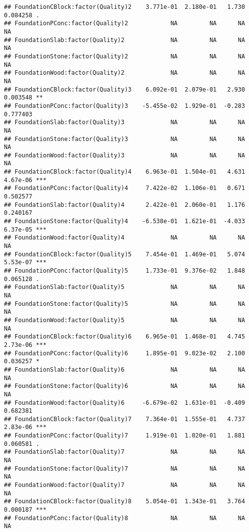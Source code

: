 \documentclass[
]{article}
\begin{document}
\begin{verbatim}
## FoundationCBlock:factor(Quality)2    3.771e-01  2.180e-01   1.730 0.084258 .  
## FoundationPConc:factor(Quality)2            NA         NA      NA       NA    
## FoundationSlab:factor(Quality)2             NA         NA      NA       NA    
## FoundationStone:factor(Quality)2            NA         NA      NA       NA    
## FoundationWood:factor(Quality)2             NA         NA      NA       NA    
## FoundationCBlock:factor(Quality)3    6.092e-01  2.079e-01   2.930 0.003548 ** 
## FoundationPConc:factor(Quality)3    -5.455e-02  1.929e-01  -0.283 0.777403    
## FoundationSlab:factor(Quality)3             NA         NA      NA       NA    
## FoundationStone:factor(Quality)3            NA         NA      NA       NA    
## FoundationWood:factor(Quality)3             NA         NA      NA       NA    
## FoundationCBlock:factor(Quality)4    6.963e-01  1.504e-01   4.631 4.67e-06 ***
## FoundationPConc:factor(Quality)4     7.422e-02  1.106e-01   0.671 0.502577    
## FoundationSlab:factor(Quality)4      2.422e-01  2.060e-01   1.176 0.240167    
## FoundationStone:factor(Quality)4    -6.538e-01  1.621e-01  -4.033 6.37e-05 ***
## FoundationWood:factor(Quality)4             NA         NA      NA       NA    
## FoundationCBlock:factor(Quality)5    7.454e-01  1.469e-01   5.074 5.53e-07 ***
## FoundationPConc:factor(Quality)5     1.733e-01  9.376e-02   1.848 0.065128 .  
## FoundationSlab:factor(Quality)5             NA         NA      NA       NA    
## FoundationStone:factor(Quality)5            NA         NA      NA       NA    
## FoundationWood:factor(Quality)5             NA         NA      NA       NA    
## FoundationCBlock:factor(Quality)6    6.965e-01  1.468e-01   4.745 2.73e-06 ***
## FoundationPConc:factor(Quality)6     1.895e-01  9.023e-02   2.100 0.036257 *  
## FoundationSlab:factor(Quality)6             NA         NA      NA       NA    
## FoundationStone:factor(Quality)6            NA         NA      NA       NA    
## FoundationWood:factor(Quality)6     -6.679e-02  1.631e-01  -0.409 0.682381    
## FoundationCBlock:factor(Quality)7    7.364e-01  1.555e-01   4.737 2.83e-06 ***
## FoundationPConc:factor(Quality)7     1.919e-01  1.020e-01   1.881 0.060581 .  
## FoundationSlab:factor(Quality)7             NA         NA      NA       NA    
## FoundationStone:factor(Quality)7            NA         NA      NA       NA    
## FoundationWood:factor(Quality)7             NA         NA      NA       NA    
## FoundationCBlock:factor(Quality)8    5.054e-01  1.343e-01   3.764 0.000187 ***
## FoundationPConc:factor(Quality)8            NA         NA      NA       NA    

\end{verbatim}
\end{document}
